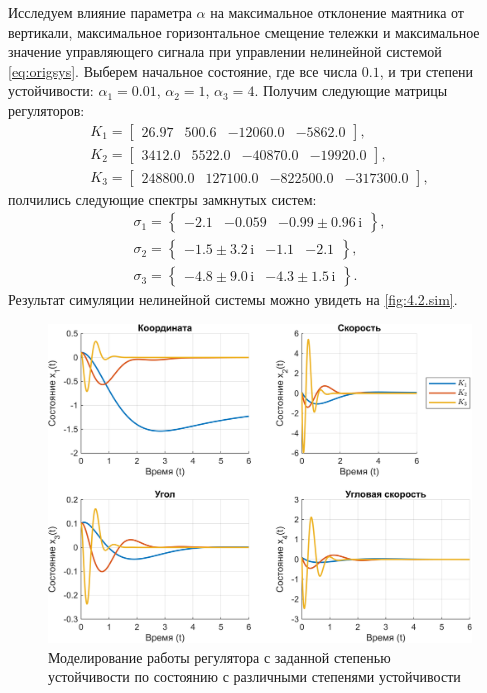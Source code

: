 Исследуем влияние параметра $\alpha$ на максимальное отклонение маятника 
от вертикали, максимальное горизонтальное смещение тележки и максимальное 
значение управляющего сигнала при управлении нелинейной системой \eqref{eq:origsys}.
Выберем начальное состояние, где все числа $0.1$, и три степени устойчивости:
$\alpha_1=0.01$, $\alpha_2=1$, $\alpha_3=4$.
Получим следующие матрицы регуляторов:
\begin{gather*}
    K_1=\begin{bmatrix}
        26.97 & 500.6 & -12060.0 & -5862.0
    \end{bmatrix},\\
    K_2=\begin{bmatrix}
        3412.0 & 5522.0 & -40870.0 & -19920.0
    \end{bmatrix},\\
    K_3=\begin{bmatrix}
        248800.0 & 127100.0 & -822500.0 & -317300.0
    \end{bmatrix},
\end{gather*}
полчились следующие спектры замкнутых систем:
\begin{gather*}
    \sigma_1=\left\{ \begin{array}{ccc}
-2.1&
-0.059&
-0.99\pm0.96\,\mathrm{i}
    \end{array} \right\},\\
    \sigma_2=\left\{ \begin{array}{ccc}
-1.5\pm3.2\,\mathrm{i}&
-1.1&
-2.1
    \end{array} \right\},\\
    \sigma_3=\left\{ \begin{array}{cc}
-4.8\pm9.0\,\mathrm{i}&
-4.3\pm1.5\,\mathrm{i}
    \end{array} \right\}.
\end{gather*}
Результат симуляции нелинейной системы можно увидеть на \autoref{fig:4.2.sim}.
\begin{figure}[H]
    \centering
    \includegraphics[width=\linewidth]{figs/4.2.sim.png}
    \caption{Моделирование работы регулятора с заданной степенью устойчивости 
    по состоянию с различными степенями устойчивости}
    \label{fig:4.2.sim}
\end{figure}
